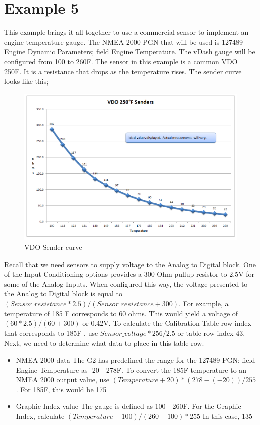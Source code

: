 \documentclass[12pt, letterpaper, twoside, titlepage]{article}
\begin{document}
\section{Example 5}
 This example brings it all together to use a commercial sensor to implement an engine temperature gauge.  The NMEA 2000 PGN that will be used is 127489 Engine Dynamic Parameters; field Engine Temperature.  The vDash gauge will be configured from 100 to 260F. The sensor in this example is a common VDO 250F.  It is a resistance that drops as the temperature rises.  The sender curve looks like this;
\begin{figure}[hbt!]
  \includegraphics[width=\linewidth]{VDO sensor curve.png}
  \centering
  \caption{VDO Sender curve}
  \label{fig:Sender Curve}
\end{figure}

Recall that we need sensors to supply voltage to the Analog to Digital block.  One of the Input Conditioning options provides a 300 Ohm pullup resistor to 2.5V for some of the Analog Inputs. When configured this way, the voltage presented to the Analog to Digital block is equal to$ (Sensor\_resistance  * 2.5 ) / (Sensor\_resistance + 300)$.  For example, a temperature  of 185 F corresponds to 60 ohms.  This would yield a voltage of $(60 * 2.5) / (60 + 300)$ or 0.42V.  To calculate the Calibration Table row index that corresponds to 185F ,
 use $ Sensor\_voltage * 256 / 2.5 $  or table row index 43. 
Next, we need to determine what data to place in this table row.  
\begin{itemize}
\item NMEA 2000 data
The G2 has predefined the range for the 127489 PGN; field Engine Temperature as -20 - 278F. To convert the 185F temperature to an NMEA 2000 output value, use $ (Temperature + 20) * (278 -  (-20))/255 $.  For 185F, this would be 175
\item Graphic Index value
The gauge is defined as 100 - 260F.  For the Graphic Index, calculate $(Temperature - 100) / (260 - 100) * 255$  In this case, 135 
\end{itemize}
\end{document}
